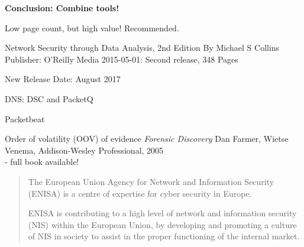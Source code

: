 \documentclass[Screen16to9,17pt]{foils}
\begin{document}
\vskip 2cm
\centerline{\bf\Large Conclusion: Combine tools!}




Low page count, but high value! Recommended.

Network Security through Data Analysis, 2nd Edition
By Michael S Collins
Publisher: O'Reilly Media
2015-05-01: Second release, 348 Pages

New Release Date: August 2017



\begin{list2}
\item DNS: DSC and PacketQ 
\item Packetbeat 

\item {}
\item {}
\end{list2}




\begin{list1}
\item Order of volatility (OOV) of evidence
\emph{Forensic Discovery} Dan Farmer, Wietse Venema,  Addison-Wesley Professional, 2005\\
 - full book available!

\end{list1}





\begin{quote}
  The European Union Agency for Network and Information Security (ENISA) is a centre of expertise for cyber security in Europe.

ENISA is contributing to a high level of network and information security (NIS) within the European Union, by developing and promoting a culture of NIS in society to assist in the proper functioning of the internal market.
\end{quote}
\end{document}
